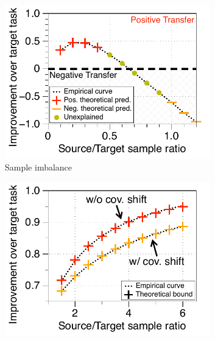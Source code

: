 
\begin{figure}[!t]
	\begin{subfigure}[b]{0.32\textwidth}
		\centering
		\includegraphics[width=0.98\textwidth]{figures/datapoints_phase_transition.pdf}
		\caption{Sample imbalance}
		\label{fig_size}
	\end{subfigure}\hfill
	\begin{subfigure}[b]{0.32\textwidth}
		\centering
		\includegraphics[width=0.98\textwidth]{figures/complementary.pdf}

\end{subfigure}
\end{figure}
